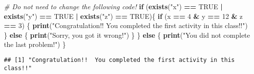 \documentclass[
]{article}
\newenvironment{Shaded}{\begin{snugshade}}{\end{snugshade}}
\newcommand{\CommentTok}[1]{\textcolor[rgb]{0.56,0.35,0.01}{\textit{#1}}}
\newcommand{\ConstantTok}[1]{\textcolor[rgb]{0.56,0.35,0.01}{#1}}
\newcommand{\ControlFlowTok}[1]{\textcolor[rgb]{0.13,0.29,0.53}{\textbf{#1}}}
\newcommand{\DecValTok}[1]{\textcolor[rgb]{0.00,0.00,0.81}{#1}}
\newcommand{\FunctionTok}[1]{\textcolor[rgb]{0.13,0.29,0.53}{\textbf{#1}}}
\newcommand{\NormalTok}[1]{#1}
\newcommand{\SpecialCharTok}[1]{\textcolor[rgb]{0.81,0.36,0.00}{\textbf{#1}}}
\newcommand{\StringTok}[1]{\textcolor[rgb]{0.31,0.60,0.02}{#1}}
\begin{document}
\begin{Shaded}
\begin{Highlighting}[]
\CommentTok{\# Do not need to change the following code!}
\ControlFlowTok{if}\NormalTok{ (}\FunctionTok{exists}\NormalTok{(}\StringTok{"x"}\NormalTok{) }\SpecialCharTok{==} \ConstantTok{TRUE} \SpecialCharTok{|} \FunctionTok{exists}\NormalTok{(}\StringTok{"y"}\NormalTok{) }\SpecialCharTok{==} \ConstantTok{TRUE} \SpecialCharTok{|} \FunctionTok{exists}\NormalTok{(}\StringTok{"z"}\NormalTok{) }\SpecialCharTok{==} \ConstantTok{TRUE}\NormalTok{)\{}
  \ControlFlowTok{if}\NormalTok{ (x }\SpecialCharTok{==} \DecValTok{4} \SpecialCharTok{\&}\NormalTok{ y }\SpecialCharTok{==} \DecValTok{12} \SpecialCharTok{\&}\NormalTok{ z }\SpecialCharTok{==} \DecValTok{3}\NormalTok{) \{}
  \FunctionTok{print}\NormalTok{(}\StringTok{"Congratulation!!  You completed the first activity in this class!!"}\NormalTok{)}
\NormalTok{  \} }\ControlFlowTok{else}\NormalTok{ \{}
    \FunctionTok{print}\NormalTok{(}\StringTok{"Sorry, you got it wrong!"}\NormalTok{)}
\NormalTok{  \}}
\NormalTok{\} }\ControlFlowTok{else}\NormalTok{ \{}
  \FunctionTok{print}\NormalTok{(}\StringTok{"You did not complete the last problem!"}\NormalTok{)}
\NormalTok{\}}
\end{Highlighting}
\end{Shaded}

\begin{verbatim}
## [1] "Congratulation!!  You completed the first activity in this class!!"
\end{verbatim}
\end{document}

